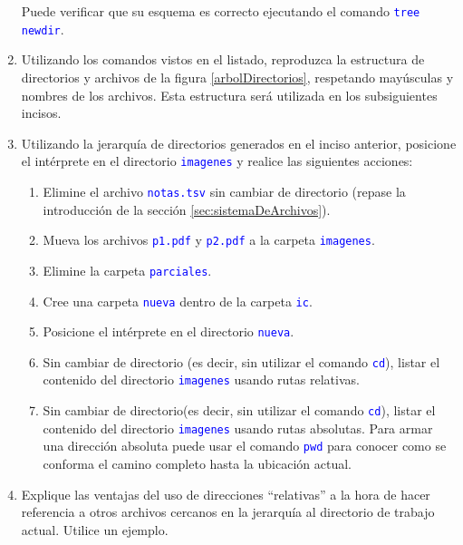 \documentclass[12pt]{article}
\newcommand{\cw}[1]{\texttt{\textcolor{blue}{#1}}}
\begin{document}
\begin{enumerate}[resume]
        Puede verificar que su esquema es correcto ejecutando el comando
        \cw{tree newdir}.

    \item Utilizando los comandos vistos en el listado, reproduzca la
        estructura de directorios y archivos de la figura
        \ref{arbolDirectorios}, respetando mayúsculas y nombres de los
        archivos. Esta estructura será utilizada en los subsiguientes incisos.

    \item Utilizando la jerarquía de directorios generados en el inciso
        anterior, posicione el intérprete en el directorio \cw{imagenes} y
        realice las siguientes acciones:

    \begin{enumerate}

        \item Elimine el archivo \cw{notas.tsv} sin cambiar de directorio
            (repase la introducción de la sección
            \ref{sec:sistemaDeArchivos}).

        \item Mueva los archivos \cw{p1.pdf} y \cw{p2.pdf} a la carpeta
            \cw{imagenes}.

        \item Elimine la carpeta \cw{parciales}.

        \item Cree una carpeta \cw{nueva} dentro de la carpeta \cw{ic}.

        \item Posicione el intérprete en el directorio \cw{nueva}.

        \item Sin cambiar de directorio (es decir, sin utilizar el comando
            \cw{cd}), listar el contenido del directorio \cw{imagenes} usando
            rutas relativas.

        \item Sin cambiar de directorio(es decir, sin utilizar el comando
            \cw{cd}), listar el contenido del directorio \cw{imagenes} usando
            rutas absolutas. Para armar una dirección absoluta puede usar el
            comando \cw{pwd} para conocer como se conforma el camino completo
            hasta la ubicación actual.

    \end{enumerate}

    \item Explique las ventajas del uso de direcciones ``relativas'' a la
            hora de hacer referencia a otros archivos cercanos en la jerarquía
            al directorio de trabajo actual. Utilice un ejemplo.


\end{enumerate}
\end{document}

